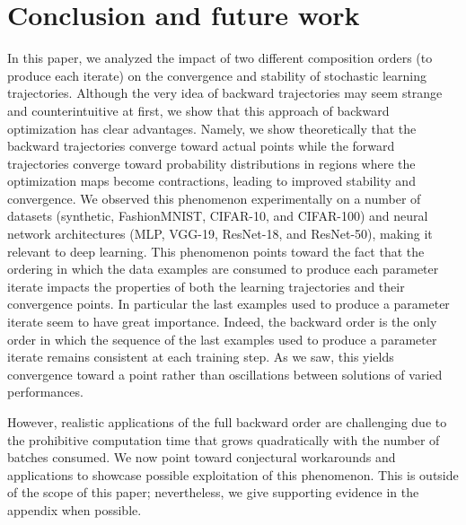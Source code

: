 \documentclass[10pt]{article} %
\theoremstyle{plain}
\theoremstyle{definition}
\theoremstyle{remark}
\begin{document}
\section{Conclusion and future work}\label{sec:conclusion}

In this paper, we analyzed the impact of two different composition orders (to produce each iterate) on the convergence and stability of stochastic learning trajectories. Although the very idea of backward trajectories may seem  strange and counterintuitive at first, we show that this approach of backward optimization has clear advantages. Namely, we show theoretically that the backward trajectories converge toward actual points while the forward trajectories converge toward probability distributions in regions where the optimization maps become contractions, leading to improved stability and convergence.
We observed this phenomenon experimentally on a number of datasets (synthetic, FashionMNIST, CIFAR-10, and CIFAR-100) and neural network architectures (MLP, VGG-19, ResNet-18, and ResNet-50), making it relevant to deep learning.
This phenomenon points toward the fact that the ordering in which the data examples are consumed to produce each parameter iterate impacts the properties of both the learning trajectories and their convergence points. 
In particular the last examples used to produce a parameter iterate seem to have great importance. Indeed, the backward order is the only order in which the sequence of the last examples used to produce a parameter iterate remains consistent at each training step. As we saw, this yields convergence toward a point rather than oscillations between solutions of varied performances.  



However, realistic applications of the full backward order are challenging due to the prohibitive computation time that grows quadratically with the number of batches consumed. We now point toward conjectural workarounds and applications to showcase possible exploitation of this phenomenon. This is outside of the scope of this paper; nevertheless, we give supporting evidence in the appendix when possible. 
\end{document}
